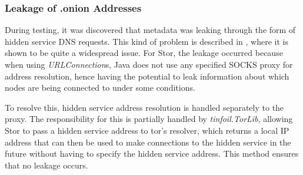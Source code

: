		\subsubsection*{Leakage of .onion Addresses}
			During testing, it was discovered that metadata was leaking through the form of hidden service DNS requests. This kind of problem is described in \cite{Thomas:2014:MLO:2665943.2665951}, where it is shown to be quite a widespread issue. For Stor, the leakage occurred because when using \textit{URLConnection}s, Java does not use any specified SOCKS proxy for address resolution, hence having the potential to leak information about which nodes are being connected to under some conditions.
			
			To resolve this, hidden service address resolution is handled separately to the proxy. The responsibility for this is partially handled by \textit{tinfoil.TorLib}, allowing Stor to pass a hidden service address to tor's resolver, which returns a local IP address that can then be used to make connections to the hidden service in the future without having to specify the hidden service address. This method ensures that no leakage occurs.